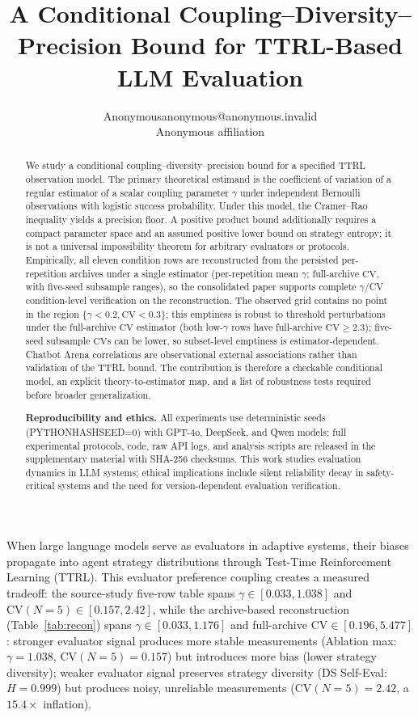 \documentclass[11pt]{article}
\author{\name Anonymous\email anonymous@anonymous.invalid\\\addr Anonymous affiliation}
\title{A Conditional Coupling--Diversity--Precision Bound for TTRL-Based LLM Evaluation}
\begin{document}
\maketitle
\begin{abstract}
We study a conditional coupling--diversity--precision bound for a specified TTRL observation model. The primary theoretical estimand is the coefficient of variation of a regular estimator of a scalar coupling parameter $\gamma$ under independent Bernoulli observations with logistic success probability. Under this model, the Cramer--Rao inequality yields a precision floor. A positive product bound additionally requires a compact parameter space and an assumed positive lower bound on strategy entropy; it is not a universal impossibility theorem for arbitrary evaluators or protocols. Empirically, all eleven condition rows are reconstructed from the persisted per-repetition archives under a single estimator (per-repetition mean $\gamma$; full-archive $\mathrm{CV}$, with five-seed subsample ranges), so the consolidated paper supports complete $\gamma$/CV condition-level verification on the reconstruction. The observed grid contains no point in the region $\{\gamma<0.2,\mathrm{CV}<0.3\}$; this emptiness is robust to threshold perturbations under the full-archive $\mathrm{CV}$ estimator (both low-$\gamma$ rows have full-archive $\mathrm{CV} \geq 2.3$); five-seed subsample $\mathrm{CV}$s can be lower, so subset-level emptiness is estimator-dependent. Chatbot Arena correlations are observational external associations rather than validation of the TTRL bound. The contribution is therefore a checkable conditional model, an explicit theory-to-estimator map, and a list of robustness tests required before broader generalization.


\textbf{Reproducibility and ethics.} All experiments use deterministic seeds (PYTHONHASHSEED=0) with GPT-4o, DeepSeek, and Qwen models; full experimental protocols, code, raw API logs, and analysis scripts are released in the supplementary material with SHA-256 checksums. This work studies evaluation dynamics in LLM systems; ethical implications include silent reliability decay in safety-critical systems and the need for version-dependent evaluation verification.\end{abstract}




When large language models serve as evaluators in adaptive systems, their biases propagate into agent strategy distributions through Test-Time Reinforcement Learning (TTRL). This evaluator preference coupling creates a measured tradeoff: the source-study five-row table spans $\gamma \in [0.033, 1.038]$ and $\mathrm{CV}(N{=}5) \in [0.157, 2.42]$, while the archive-based reconstruction (Table~\ref{tab:recon}) spans $\gamma \in [0.033, 1.176]$ and full-archive $\mathrm{CV} \in [0.196, 5.477]$: stronger evaluator signal produces more stable measurements (Ablation max: $\gamma = 1.038$, $\mathrm{CV}(N{=}5) = 0.157$) but introduces more bias (lower strategy diversity); weaker evaluator signal preserves strategy diversity (DS Self-Eval: $H = 0.999$) but produces noisy, unreliable measurements ($\mathrm{CV}(N{=}5) = 2.42$, a $15.4\times$ inflation).
\end{document}
